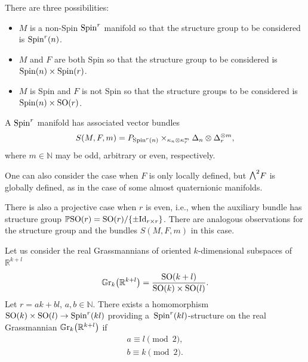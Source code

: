 \documentclass[10pt,a4paper]{amsart}
\newcommand{\ext}{\raise1pt\hbox{\small$\bigwedge$}}
\numberwithin{equation}{section}
\begin{document}
\begin{Remark}There are three possibilities:
\begin{itemize}\itemsep=0pt
 \item $M$ is a non-Spin ${\rm Spin}^r$ manifold so that the structure group to be considered is ${\rm Spin}^r(n)$.
 \item $M$ and $F$ are both Spin so that the structure group to be considered is ${\rm Spin}(n)\times {\rm Spin}(r)$.
 \item $M$ is Spin and $F$ is not Spin so that the structure groups to be considered is ${\rm Spin}(n)\times {\rm SO}(r)$.
\end{itemize}
A ${\rm Spin}^r$ manifold has associated vector bundles
\begin{gather*} S(M,F,m)=P_{{\rm Spin}^r(n)}\times_{\kappa_n\otimes\kappa_r^{m}}\Delta_n\otimes\Delta_r^{\otimes m},\end{gather*}
where $m\in\mathbb{N}$ may be odd, arbitrary or even, respectively.
\end{Remark}

\begin{Remark} One can also consider the case when $F$ is only locally defined, but $\ext^2 F$ is globally defined, as in the case of some almost quaternionic manifolds.
\end{Remark}

\begin{Remark} There is also a projective case when $r$ is even, i.e., when the auxiliary bundle has structure group $\mathbb{P}{\rm SO}(r)={\rm SO}(r)/\{\pm {\rm Id}_{r\times r}\}$. There are analogous observations for the structure group and the bundles $S(M,F,m)$ in this case.
\end{Remark}

\begin{Example} Let us consider the real Grassmannians of oriented $k$-dimensional subspaces of $\mathbb{R}^{k+l}$
\begin{gather*}\mathbb{G}{\rm r}_k\big(\mathbb{R}^{k+l}\big)={{\rm SO}(k+l)\over {\rm SO}(k)\times {\rm SO}(l)}.\end{gather*}
Let $r = ak + bl$, $a,b\in\mathbb{N}$. There exists a homomorphism ${\rm SO}(k)\times {\rm SO}(l)\rightarrow {\rm Spin}^{r}(kl)$ providing a~${\rm Spin}^{r}(kl)$-structure on the real Grassmannian $\mathbb{G}{\rm r}_k\big(\mathbb{R}^{k+l}\big)$ if
\begin{gather*}
 a \equiv l \pmod 2,\\
b \equiv k \pmod 2.
\end{gather*}
\end{Example}
\end{document}
